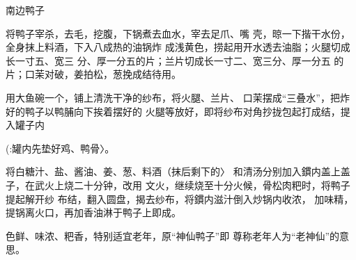 \begin{recipe}[神仙鸭子]{南边鸭子}

\ingredients




\cooking

\step 	将鸭子宰杀，去毛，挖腹，下锅煮去血水，宰去足爪、嘴 壳，晾一下揩干水份，全身抹上料酒，下入八成热的油锅炸 成浅黄色，捞起用开水透去油脂；火腿切成长一寸五、宽三 分、厚一分五的片；兰片切成长一寸二、宽三分、厚一分五 的片；口茉对破，姜拍松，葱挽成结待用。

\step 	用大鱼碗一个，铺上清洗干净的纱布，将火腿、兰片、 口茉摆成“三叠水”，把炸好的鸭子以鸭脯向下挨着摆好的 火腿等放好，即将纱布对角抄拢包起打成结，提入罐子内

(:罐内先垫好鸡、鸭骨〉。

\step 	将白糖汁、盐、酱油、姜、葱、料酒（抹后剩下的〉 和清汤分别加入鏆内盖上盖子，在武火上烧二十分钟，改用 文火，继续烧至十分火候，骨松肉粑时，将鸭子提起解开纱 布结，翻入圆盘，揭去纱布，将鏆内滋汁倒入炒锅内收浓， 加味精，提锅离火口，再加香油淋于鸭子上即成。

\notes

色鲜、味浓、粑香，特别适宜老年，原“神仙鸭子”即 尊称老年人为“老神仙”的意思。

\end{recipe}

